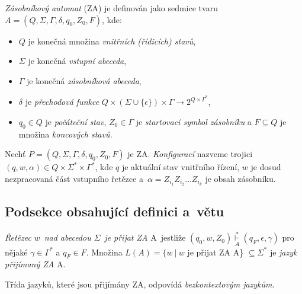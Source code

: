 \documentclass[a4paper, twocolumn, 11pt]{article}
\begin{document}
\label{definicia}
\begin{definicia}
\emph{Zásobníkový automat} (ZA) je definován jako sedmice tvaru $A =(Q,\Sigma,\Gamma,\delta,q_0,Z_0,F)$, kde: 
\begin{itemize}
        \item $Q$ je konečná množina \emph{vnitřních (řídicích) stavů}, 
        \item $\Sigma$ je konečná \emph{vstupní abeceda}, 
        \item $\Gamma$ je konečná \emph{zásobníková abeceda}, 
        \item $\delta$ je \emph{přechodová funkce} $Q \times (\Sigma \cup \{\epsilon\}) \times \Gamma \rightarrow 2^{Q \times \Gamma^*}$,
        \item $q_0 \in Q$ je \emph{počáteční stav}, $Z_0 \in \Gamma$ je \emph{startovací symbol zásobníku }a $F \subseteq Q$ je množina \emph{koncových stavů.} 
\end{itemize}
\end{definicia}

Nechť $P =(Q,\Sigma,\Gamma,\delta,q_0,Z_0,F)$ je ZA. \emph{Konfigurací} nazveme trojici $(q, w, \alpha) \in Q \times \Sigma^* \times \Gamma^*$, kde $q$ je aktuální stav vnitřního řízení, $w$ je dosud nezpracovaná část vstupního řetězce a~$\alpha = Z_{i_1}Z_{i_2} \dots Z_{i_k}$ je obsah zásobníku.

\subsection{Podsekce obsahující definici a~větu}
\begin{definicia}
\emph{Řetězec} $w$~\emph{nad abecedou} $\Sigma$~\emph{je přijat ZA} A~jestliže $(q_0, w, Z_0) \overset{\ast}{\underset{A}{\vdash}} (q_F,\epsilon, \gamma)$ pro nějaké $\gamma \in \Gamma^*$ a $q_F \in F$. Množina $L(A) = \{w\ |\ w $ je přijat ZA A\} $\subseteq \Sigma^*$ je \emph{jazyk přijímaný ZA} A.
\end{definicia}
\begin{veta}
Třída jazyků, které jsou přijímány ZA, odpovídá \emph{bezkontextovým jazykům}.
\end{veta}
\end{document}
